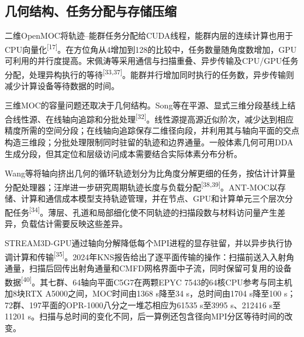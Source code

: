 \documentclass[UTF8, zihao=-4, fontset=none, a4paper]{ctexart}
\newcommand{\upcite}[1]{\textsuperscript{[#1]}}
\begin{document}
\subsection{几何结构、任务分配与存储压缩}

二维OpenMOC将轨迹--能群任务分配给CUDA线程，能群内层的连续计算也用于CPU向量化\upcite{17}。在方位角从4增加到128的比较中，任务数量随角度数增加，GPU可利用的并行度提高。宋佩涛等采用通信与扫描重叠、异步传输及CPU/GPU任务分配，处理异构执行的等待\upcite{33,37}。能群并行增加同时执行的任务数，异步传输则减少计算设备等待数据的时间。

三维MOC的容量问题还取决于几何结构。Song等在平源、显式三维分段基线上结合线性源、在线轴向追踪和分批处理\upcite{32}。线性源提高源近似阶次，减少达到相应精度所需的空间分段；在线轴向追踪保存二维径向段，并利用其与轴向平面的交点构造三维段；分批处理限制同时驻留的轨迹和边界通量。一般体素几何可用DDA生成分段，但其定位和层级访问成本需要结合实际体素分布分析。

Wang等将轴向挤出几何的循环轨迹划分为比角度分解更细的任务，按估计计算量分配处理器；汪岸进一步研究周期轨迹长度与负载分配\upcite{38,39}。ANT-MOC以存储、计算和通信成本模型支持轨迹管理，并在节点、GPU和计算单元三个层次分配任务\upcite{34}。薄层、孔道和局部细化使不同轨迹的扫描段数与材料访问量产生差异，负载估计需要反映这些差异。

STREAM3D-GPU通过轴向分解降低每个MPI进程的显存驻留，并以异步执行协调计算和传输\upcite{35}。2024年KNS报告给出了逐平面传输的操作：扫描前送入入射角通量，扫描后回传出射角通量和CMFD网格界面中子流，同时保留可复用的设备数据\upcite{40}。其七群、64轴向平面C5G7在两颗EPYC 7543的64核CPU参考与同主机加8块RTX A5000之间，MOC时间由1368 s降至34 s，总时间由1704 s降至100 s；72群、197平面的OPR-1000八分之一堆芯相应为61535 s至3995 s、212416 s至11201 s。扫描与总时间的变化不同，后一算例还包含径向MPI分区等待时间的改变。
\end{document}
